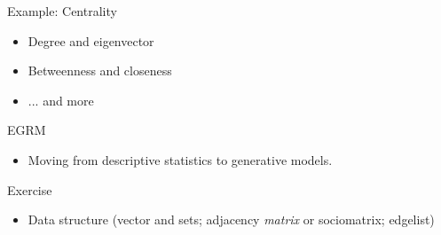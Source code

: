 \begin{frame}{Example: Centrality}
	\begin{itemize}
		\item Degree and eigenvector
		\item Betweenness and closeness
		\item ... and more
	\end{itemize}
\end{frame}

\begin{frame}{EGRM}
	\begin{itemize}
		\item Moving from descriptive statistics to generative models.
	\end{itemize}
\end{frame}

\begin{frame}{Exercise}
	\begin{itemize}
		\item Data structure (vector and sets; adjacency \textit{matrix} or sociomatrix; edgelist)
	\end{itemize}
\end{frame}





